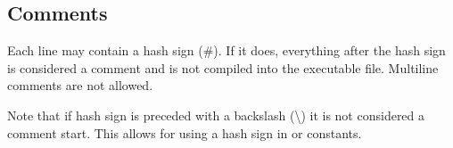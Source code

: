 \subsection{Comments}

Each line may contain a hash sign (\#).
If it does, everything after the hash sign is considered a comment and
is not compiled into the executable file.
Multiline comments are not allowed.

Note that if hash sign is preceded with a backslash (\textbackslash)
it is not considered a comment start.
This allows for using a hash sign in  or  constants.
